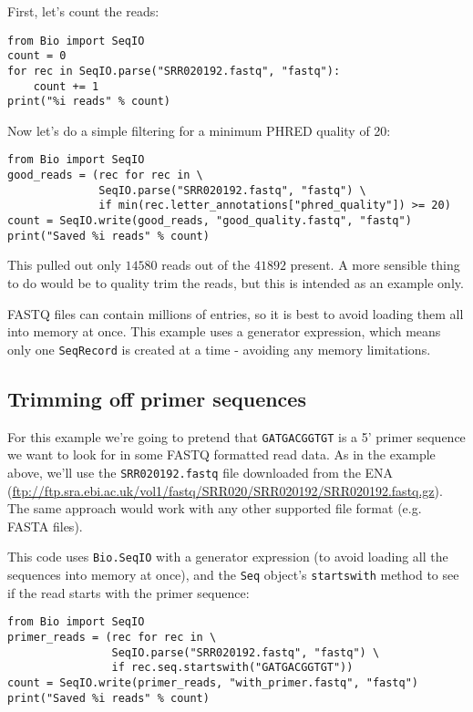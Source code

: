 \documentclass{report}
\begin{document}
First, let's count the reads:

\begin{verbatim}
from Bio import SeqIO
count = 0
for rec in SeqIO.parse("SRR020192.fastq", "fastq"):
    count += 1
print("%i reads" % count)
\end{verbatim}

\noindent Now let's do a simple filtering for a minimum PHRED quality of 20:

\begin{verbatim}
from Bio import SeqIO
good_reads = (rec for rec in \
              SeqIO.parse("SRR020192.fastq", "fastq") \
              if min(rec.letter_annotations["phred_quality"]) >= 20)
count = SeqIO.write(good_reads, "good_quality.fastq", "fastq")
print("Saved %i reads" % count)
\end{verbatim}

\noindent This pulled out only $14580$ reads out of the $41892$ present.
A more sensible thing to do would be to quality trim the reads, but this
is intended as an example only.

FASTQ files can contain millions of entries, so it is best to avoid loading
them all into memory at once.  This example uses a generator expression, which
means only one \verb|SeqRecord| is created at a time - avoiding any memory
limitations.

\subsection{Trimming off primer sequences}
\label{sec:FASTQ-slicing-off-primer}

For this example we're going to pretend that \texttt{GATGACGGTGT} is a 5' primer
sequence we want to look for in some FASTQ formatted read data.  As in the example
above, we'll use the \texttt{SRR020192.fastq} file downloaded from the ENA
(\url{ftp://ftp.sra.ebi.ac.uk/vol1/fastq/SRR020/SRR020192/SRR020192.fastq.gz}).
The same approach would work with any other supported file format (e.g. FASTA files).

This code uses \verb|Bio.SeqIO| with a generator expression (to avoid loading
all the sequences into memory at once), and the \verb|Seq| object's
\verb|startswith| method to see if the read starts with the primer sequence:

\begin{verbatim}
from Bio import SeqIO
primer_reads = (rec for rec in \
                SeqIO.parse("SRR020192.fastq", "fastq") \
                if rec.seq.startswith("GATGACGGTGT"))
count = SeqIO.write(primer_reads, "with_primer.fastq", "fastq")
print("Saved %i reads" % count)
\end{verbatim}
\end{document}
